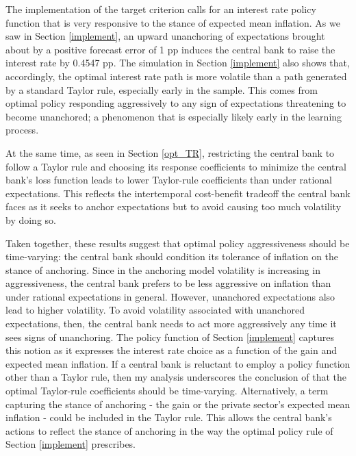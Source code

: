 \documentclass[11pt]{article}
\renewcommand{\[}{\begin{equation}}
\renewcommand{\]}{\end{equation}}
\def\ppFEunanchors{1 }
\def\ppMoveFFR{0.4547 }
\begin{document}
The implementation of the target criterion calls for an interest rate policy function that is very responsive to the stance of expected mean inflation. As we saw in Section \ref{implement}, an upward unanchoring of expectations brought about by a positive forecast error of \ppFEunanchors pp induces the central bank to raise the interest rate by \ppMoveFFR pp. The simulation in Section \ref{implement} also shows that, accordingly, the optimal interest rate path is more volatile than a path generated by a standard Taylor rule, especially early in the sample. This comes from optimal policy responding aggressively to any sign of expectations threatening to become unanchored; a phenomenon that is especially likely early in the learning process.

At the same time, as seen in Section \ref{opt_TR}, restricting the central bank to follow a Taylor rule and choosing its response coefficients to minimize the central bank's loss function leads to lower Taylor-rule coefficients than under rational expectations. This reflects the intertemporal cost-benefit tradeoff the central bank faces as it seeks to anchor expectations but to avoid causing too much volatility by doing so.  

Taken together, these results suggest that optimal policy aggressiveness should be time-varying: the central bank should condition its tolerance of inflation on the stance of anchoring. Since in the anchoring model volatility is increasing in aggressiveness, the central bank prefers to be less aggressive on inflation than under rational expectations in general. However, unanchored expectations also lead to higher volatility. To avoid volatility associated with unanchored expectations, then, the central bank needs to act more aggressively any time it sees signs of  unanchoring. The policy function of Section \ref{implement} captures this notion as it expresses the interest rate choice as a function of the gain and expected mean inflation. If a central bank is reluctant to employ a policy function other than a Taylor rule, then my analysis underscores the conclusion of \cite{LUBIK201685} that the optimal Taylor-rule coefficients should be time-varying. Alternatively, a term capturing the stance of anchoring - the gain or the private sector's expected mean inflation - could be included in the Taylor rule. This allows the central bank's actions to reflect the stance of anchoring in the way the optimal policy rule of Section \ref{implement} prescribes. 
\end{document}
